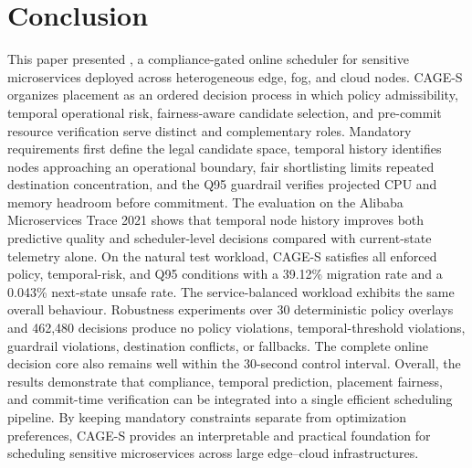 \section{Conclusion}
\label{sec:conclusion}

This paper presented \cage, a compliance-gated online scheduler for
sensitive microservices deployed across heterogeneous edge, fog, and
cloud nodes. CAGE-S organizes placement as an ordered decision process
in which policy admissibility, temporal operational risk,
fairness-aware candidate selection, and pre-commit resource verification
serve distinct and complementary roles. Mandatory requirements first
define the legal candidate space, temporal history identifies nodes
approaching an operational boundary, fair shortlisting limits repeated
destination concentration, and the Q95 guardrail verifies projected CPU
and memory headroom before commitment. The evaluation on the Alibaba Microservices Trace 2021 shows that
temporal node history improves both predictive quality and scheduler-level
decisions compared with current-state telemetry alone. On the natural
test workload, CAGE-S satisfies all enforced policy, temporal-risk, and
Q95 conditions with a 39.12\% migration rate and a 0.043\% next-state
unsafe rate. The service-balanced workload exhibits the same overall
behaviour. Robustness experiments over 30 deterministic policy overlays
and 462,480 decisions produce no policy violations, temporal-threshold
violations, guardrail violations, destination conflicts, or fallbacks.
The complete online decision core also remains well within the
30-second control interval. Overall, the results demonstrate that compliance, temporal prediction,
placement fairness, and commit-time verification can be integrated into
a single efficient scheduling pipeline. By keeping mandatory constraints
separate from optimization preferences, CAGE-S provides an interpretable
and practical foundation for scheduling sensitive microservices across
large edge--cloud infrastructures.